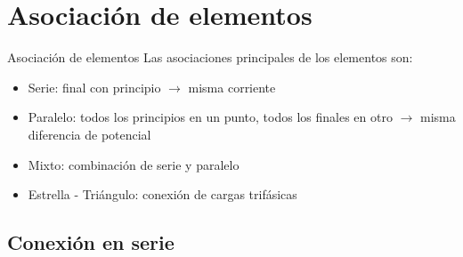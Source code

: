 \documentclass[aspectratio=169, xcolor={usenames,svgnames,dvipsnames}]{beamer}
\begin{document}
\section{Asociación de elementos}

\begin{frame}{Asociación de elementos}
    Las asociaciones principales de los elementos son:
    \begin{itemize}
        \item \alert{Serie}: final con principio $\rightarrow$ misma corriente
        \item \alert{Paralelo}: todos los principios en un punto, todos los finales en otro $\rightarrow$ misma diferencia de potencial
        \item \alert{Mixto}: combinación de serie y paralelo
        \item \alert{Estrella - Triángulo}: conexión de cargas trifásicas
    \end{itemize}
    
\end{frame}


\subsection{Conexión en serie} 
\end{document}
